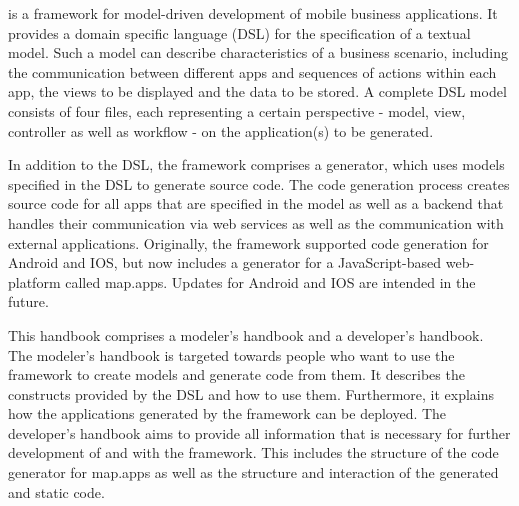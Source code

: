 
\MD is a framework for model-driven development of mobile business applications. It provides a domain specific language (DSL) for the specification of a textual model. Such a model can describe characteristics of a business scenario, including the communication between different apps and sequences of actions within each app, the views to be displayed and the data to be stored. A complete DSL model consists of four files, each representing a certain perspective - model, view, controller as well as workflow - on the application(s) to be generated.

In addition to the DSL, the \MD framework comprises a generator, which uses models specified in the DSL to generate source code. The code generation process creates source code for all apps that are specified in the model as well as a backend that handles their communication via web services as well as the communication with external applications. Originally, the \MD framework supported code generation for Android and IOS, but now includes a generator for a JavaScript-based web-platform called map.apps. Updates for Android and IOS are intended in the future.

This handbook comprises a modeler's handbook and a developer's handbook. The modeler's handbook is targeted towards people who want to use the \MD framework to create models and generate code from them. It describes the constructs provided by the DSL and how to use them. Furthermore, it explains how the applications generated by the framework can be deployed. The developer's handbook aims to provide all information that is necessary for further development of and with the \MD framework. This includes the structure of the code generator for map.apps as well as the structure and interaction of the generated and static code.
